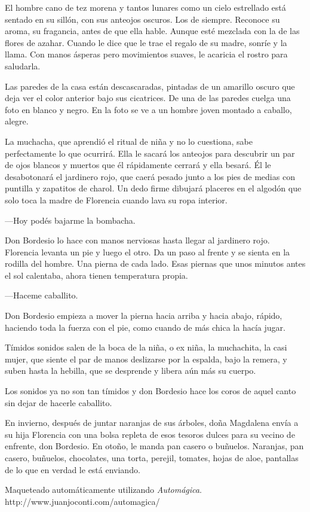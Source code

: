 \documentclass[11pt,twoside,openright]{book}
\begin{document}
El hombre cano de tez morena y tantos lunares como un cielo estrellado está sentado en su sillón, con sus anteojos oscuros. Los de siempre. Reconoce su aroma, su fragancia, antes de que ella hable. Aunque esté mezclada con la de las flores de azahar. Cuando le dice que le trae el regalo de su madre, sonríe y la llama. Con manos ásperas pero movimientos suaves, le acaricia el rostro para saludarla.

Las paredes de la casa están descascaradas, pintadas de un amarillo oscuro que deja ver el color anterior bajo sus cicatrices. De una de las paredes cuelga una foto en blanco y negro. En la foto se ve a un hombre joven montado a caballo, alegre.

La muchacha, que aprendió el ritual de niña y no lo cuestiona, sabe perfectamente lo que ocurrirá. Ella le sacará los anteojos para descubrir un par de ojos blancos y muertos que él rápidamente cerrará y ella besará. Él le desabotonará el jardinero rojo, que caerá pesado junto a los pies de medias con puntilla y zapatitos de charol. Un dedo firme dibujará placeres en el algodón que solo toca la madre de Florencia cuando lava su ropa interior.

—Hoy podés bajarme la bombacha.

Don Bordesio lo hace con manos nerviosas hasta llegar al jardinero rojo. Florencia levanta un pie y luego el otro. Da un paso al frente y se sienta en la rodilla del hombre. Una pierna de cada lado. Esas piernas que unos minutos antes el sol calentaba, ahora tienen temperatura propia.

—Haceme caballito.

Don Bordesio empieza a mover la pierna hacia arriba y hacia abajo, rápido, haciendo toda la fuerza con el pie, como cuando de más chica la hacía jugar.

Tímidos sonidos salen de la boca de la niña, o ex niña, la muchachita, la casi mujer, que siente el par de manos deslizarse por la espalda, bajo la remera, y suben  hasta la hebilla, que se desprende y libera aún más su cuerpo.

Los sonidos ya no son tan tímidos y don Bordesio hace los coros de aquel canto sin dejar de hacerle caballito.

En invierno, después de juntar naranjas de sus árboles, doña Magdalena envía a su hija Florencia con una bolsa repleta de esos tesoros dulces para su vecino de enfrente, don Bordesio. En otoño, le manda pan casero o buñuelos. Naranjas, pan casero, buñuelos, chocolates, una torta, perejil, tomates, hojas de aloe, pantallas de lo que en verdad le está enviando.



\cleardoublepage

%

\hspace{0pt}
\vfill
\begin{center}
Maqueteado automáticamente utilizando \emph{Automágica}.
\bigbreak
http://www.juanjoconti.com/automagica/
\end{center}
\vfill
\hspace{0pt}
\end{document}
